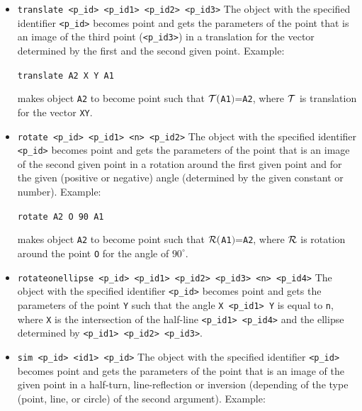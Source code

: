 \documentclass[a4paper]{book}
\begin{document}
\begin{itemize}
\item \verb|translate <p_id> <p_id1> <p_id2> <p_id3>|
        The object with the specified identifier \verb|<p_id>| becomes
        {\sc point} and gets the parameters of the point that is an image
        of the third point (\verb|<p_id3>|) in a translation for the
        vector determined by the first and the second given point.
        Example:

        \verb|translate A2 X Y A1|

        makes object \verb|A2| to become {\sc point} such that
        ${\cal T}($\verb|A1|$)$=\verb|A2|, where ${\cal T}$ is
        translation for the vector \verb|XY|.

\item \verb|rotate <p_id> <p_id1> <n> <p_id2>|
        The object with the specified identifier \verb|<p_id>| becomes {\sc point}
        and gets the parameters of the point that is an image of the second given
        point in a rotation around the first given point and for the
        given (positive or negative) angle (determined by the given
        constant or {\sc number}).
        Example:

        \verb|rotate A2 O 90 A1|

        makes object \verb|A2| to become {\sc point} such that
        ${\cal R}($\verb|A1|$)$=\verb|A2|, where ${\cal R}$ is
        rotation around the point \verb|O| for the angle of $90^\circ$.

\item \verb|rotateonellipse <p_id> <p_id1> <p_id2> <p_id3> <n> <p_id4>|
        The object with the specified identifier \verb|<p_id>| becomes {\sc point}
        and gets the parameters of the point \verb|Y| such that the angle
        \verb|X <p_id1> Y| is equal to \verb|n|, where \verb|X| is the
        intersection of the half-line \verb|<p_id1> <p_id4>| and the ellipse
        determined by \verb|<p_id1> <p_id2> <p_id3>|.


\item \verb|sim <p_id> <id1> <p_id>|
        The object with the specified identifier \verb|<p_id>| becomes
        {\sc point} and gets the parameters of the point that is an image of the
        given point in a half-turn, line-reflection or inversion (depending
        of the type ({\sc point}, {\sc line}, or {\sc circle}) of the second
        argument). Example:


\end{itemize}
\end{document}
